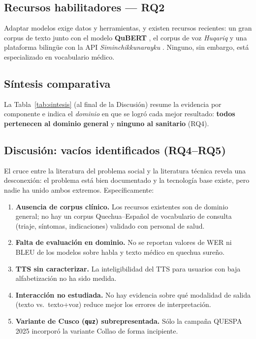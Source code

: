 \documentclass[10pt,twocolumn,a4paper]{article}
\newcommand{\quz}{\texttt{quz}}
\begin{document}
\subsection*{Recursos habilitadores --- RQ2}
Adaptar modelos exige datos y herramientas, y existen recursos recientes: un gran corpus de texto junto con el modelo \textbf{QuBERT} \parencite{Zevallos20221}, el corpus de voz \emph{Huqariq} \parencite{zevallos2022huqariq} y una plataforma biling\"ue con la API \emph{Siminchikkunarayku} \parencite{9514251}. Ninguno, sin embargo, est\'a especializado en vocabulario m\'edico.

\subsection*{S\'intesis comparativa}
La Tabla~\ref{tab:sintesis} (al final de la Discusi\'on) resume la evidencia por componente e indica el \emph{dominio} en que se logr\'o cada mejor resultado: \textbf{todos pertenecen al dominio general} y \textbf{ninguno al sanitario} (RQ4).

\subsection*{Discusi\'on: vac\'ios identificados (RQ4--RQ5)}
El cruce entre la literatura del problema social \parencite{begazo2026,cuaila2022} y la literatura t\'ecnica revela una desconexi\'on: el problema est\'a bien documentado y la tecnolog\'ia base existe, pero nadie ha unido ambos extremos. Espec\'ificamente:
\begin{enumerate}[label=\textbf{\textcolor{cNavy}{\arabic*.}}]
  \item \textbf{Ausencia de corpus cl\'inico.} Los recursos existentes \parencite{zevallos2022huqariq} son de dominio general; no hay un corpus Quechua--Espa\~nol de vocabulario de consulta (triaje, s\'intomas, indicaciones) validado con personal de salud.
  \item \textbf{Falta de evaluaci\'on en dominio.} No se reportan valores de WER ni BLEU de los modelos sobre habla y texto m\'edico en quechua sure\~no.
  \item \textbf{TTS sin caracterizar.} La inteligibilidad del TTS para usuarios con baja alfabetizaci\'on no ha sido medida.
  \item \textbf{Interacci\'on no estudiada.} No hay evidencia sobre qu\'e modalidad de salida (texto vs.\ texto+voz) reduce mejor los errores de interpretaci\'on.
  \item \textbf{Variante de Cusco (\quz) subrepresentada.} S\'olo la campa\~na QUESPA 2025 \parencite{Ortega2025260} incorpor\'o la variante Collao de forma incipiente.
\end{enumerate}
\end{document}
